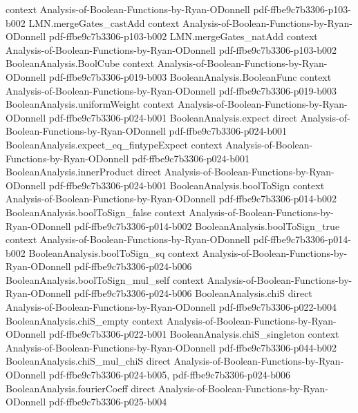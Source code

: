 \begin{lemma}
  {context}
  {Analysis-of-Boolean-Functions-by-Ryan-ODonnell}
  {pdf-ffbe9c7b3306-p103-b002}
\proofstep
  {LMN.mergeGates_castAdd}
  {context}
  {Analysis-of-Boolean-Functions-by-Ryan-ODonnell}
  {pdf-ffbe9c7b3306-p103-b002}
\proofstep
  {LMN.mergeGates_natAdd}
  {context}
  {Analysis-of-Boolean-Functions-by-Ryan-ODonnell}
  {pdf-ffbe9c7b3306-p103-b002}
\proofstep
  {BooleanAnalysis.BoolCube}
  {context}
  {Analysis-of-Boolean-Functions-by-Ryan-ODonnell}
  {pdf-ffbe9c7b3306-p019-b003}
\proofstep
  {BooleanAnalysis.BooleanFunc}
  {context}
  {Analysis-of-Boolean-Functions-by-Ryan-ODonnell}
  {pdf-ffbe9c7b3306-p019-b003}
\proofstep
  {BooleanAnalysis.uniformWeight}
  {context}
  {Analysis-of-Boolean-Functions-by-Ryan-ODonnell}
  {pdf-ffbe9c7b3306-p024-b001}
\proofstep
  {BooleanAnalysis.expect}
  {direct}
  {Analysis-of-Boolean-Functions-by-Ryan-ODonnell}
  {pdf-ffbe9c7b3306-p024-b001}
\proofstep
  {BooleanAnalysis.expect_eq_fintypeExpect}
  {context}
  {Analysis-of-Boolean-Functions-by-Ryan-ODonnell}
  {pdf-ffbe9c7b3306-p024-b001}
\proofstep
  {BooleanAnalysis.innerProduct}
  {direct}
  {Analysis-of-Boolean-Functions-by-Ryan-ODonnell}
  {pdf-ffbe9c7b3306-p024-b001}
\proofstep
  {BooleanAnalysis.boolToSign}
  {context}
  {Analysis-of-Boolean-Functions-by-Ryan-ODonnell}
  {pdf-ffbe9c7b3306-p014-b002}
\proofstep
  {BooleanAnalysis.boolToSign_false}
  {context}
  {Analysis-of-Boolean-Functions-by-Ryan-ODonnell}
  {pdf-ffbe9c7b3306-p014-b002}
\proofstep
  {BooleanAnalysis.boolToSign_true}
  {context}
  {Analysis-of-Boolean-Functions-by-Ryan-ODonnell}
  {pdf-ffbe9c7b3306-p014-b002}
\proofstep
  {BooleanAnalysis.boolToSign_sq}
  {context}
  {Analysis-of-Boolean-Functions-by-Ryan-ODonnell}
  {pdf-ffbe9c7b3306-p024-b006}
\proofstep
  {BooleanAnalysis.boolToSign_mul_self}
  {context}
  {Analysis-of-Boolean-Functions-by-Ryan-ODonnell}
  {pdf-ffbe9c7b3306-p024-b006}
\proofstep
  {BooleanAnalysis.chiS}
  {direct}
  {Analysis-of-Boolean-Functions-by-Ryan-ODonnell}
  {pdf-ffbe9c7b3306-p022-b004}
\proofstep
  {BooleanAnalysis.chiS_empty}
  {context}
  {Analysis-of-Boolean-Functions-by-Ryan-ODonnell}
  {pdf-ffbe9c7b3306-p022-b001}
\proofstep
  {BooleanAnalysis.chiS_singleton}
  {context}
  {Analysis-of-Boolean-Functions-by-Ryan-ODonnell}
  {pdf-ffbe9c7b3306-p044-b002}
\proofstep
  {BooleanAnalysis.chiS_mul_chiS}
  {direct}
  {Analysis-of-Boolean-Functions-by-Ryan-ODonnell}
  {pdf-ffbe9c7b3306-p024-b005,
    pdf-ffbe9c7b3306-p024-b006}
\proofstep
  {BooleanAnalysis.fourierCoeff}
  {direct}
  {Analysis-of-Boolean-Functions-by-Ryan-ODonnell}
  {pdf-ffbe9c7b3306-p025-b004}
\proofstep

\end{lemma}
